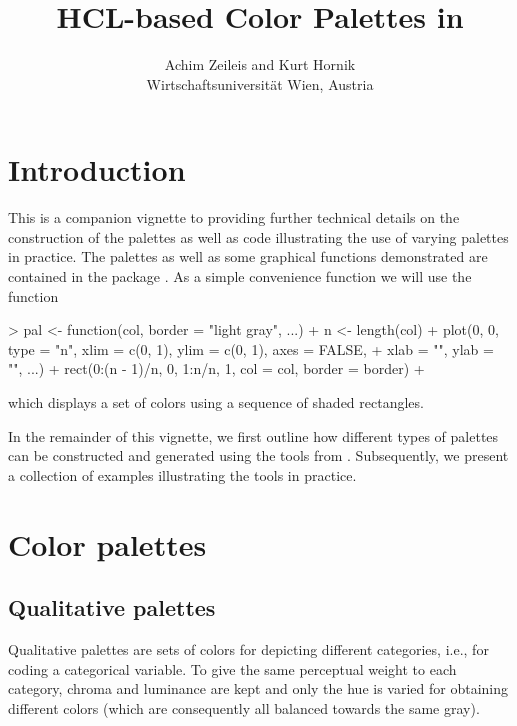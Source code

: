 \documentclass{Z}
\title{HCL-based Color Palettes in \proglang{R}}
\author{Achim Zeileis \textnormal{and} Kurt Hornik\\Wirtschaftsuniversit\"at Wien, Austria}
\begin{document}


\section{Introduction} \label{sec:intro}

This is a companion vignette to \cite{vcd:Zeileis+Hornik:2006} providing
further technical details on the construction of the palettes as well as
 code illustrating the use of varying palettes in practice.
The palettes as well as some graphical functions demonstrated are contained
in the package .
As a simple convenience function we will use the function
\begin{Schunk}
\begin{Sinput}
> pal <- function(col, border = "light gray", ...) {
+     n <- length(col)
+     plot(0, 0, type = "n", xlim = c(0, 1), ylim = c(0, 1), axes = FALSE, 
+         xlab = "", ylab = "", ...)
+     rect(0:(n - 1)/n, 0, 1:n/n, 1, col = col, border = border)
+ }
\end{Sinput}
\end{Schunk}
which displays a set of colors using a sequence of shaded rectangles.

In the remainder of this vignette, we first outline how different types of palettes
can be constructed and generated using the tools from . Subsequently,
we present a collection of examples illustrating the tools in practice.


\section{Color palettes} \label{sec:palettes}

\subsection{Qualitative palettes} \label{sec:qualitative}

Qualitative palettes are sets of colors for depicting different categories,
i.e., for coding a categorical variable. To give the same
perceptual weight to each category, chroma and luminance are kept 
and only the hue is varied for obtaining different colors
(which are consequently all balanced towards the same gray). 
\end{document}
